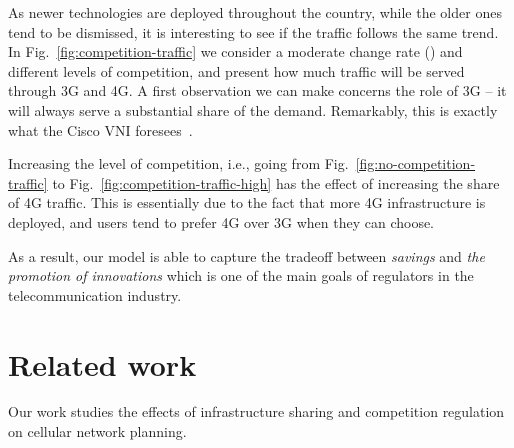 \documentclass[10pt,journal,cspaper,compsoc]{IEEEtran}
\newcommand{\Fig}[1]{Fig.~\ref{fig:#1}}
\begin{document}
As newer technologies are deployed throughout the country, while the older ones tend to be dismissed,
it is interesting to see if the traffic follows the same trend.
In \Fig{competition-traffic} we consider a moderate change rate () and different levels of competition,
and present how much traffic will be served through 3G and 4G. A first observation we can
make concerns the role of 3G -- it will always serve a substantial share of the demand.
Remarkably, this is exactly what the Cisco VNI foresees~\cite{cisco}.

Increasing the level of competition, i.e., going from \Fig{no-competition-traffic}
to \Fig{competition-traffic-high} has the effect of increasing the share of 4G traffic.
This is essentially due to the fact that more 4G infrastructure is deployed, and users tend
to prefer 4G over 3G when they can choose.

\begin{figure*}
\centering
{}
\label{fig:competition-traffic}
\caption{Traffic served per technology for each time period~, when  (a), and  (b).}
\end{figure*}

As a result, our model is able to capture the tradeoff between \emph{savings} and \emph{the promotion of innovations} which is one of the main goals of regulators in the telecommunication industry. 

\section{Related work}
\label{sec:related}

Our work studies the effects of infrastructure sharing and competition regulation on cellular network planning.
\end{document}
